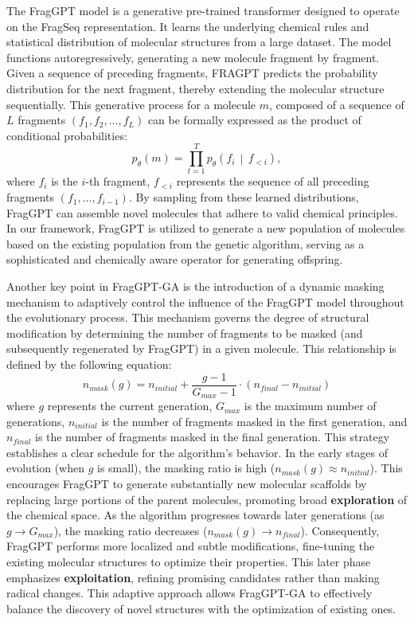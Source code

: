 \documentclass[lettersize,journal]{IEEEtran}
\begin{document}
The FragGPT model is a generative pre-trained transformer designed to operate on the FragSeq representation. It learns the underlying chemical rules and statistical distribution of molecular structures from a large dataset. The model functions autoregressively, generating a new molecule fragment by fragment. Given a sequence of preceding fragments, FRAGPT predicts the probability distribution for the next fragment, thereby extending the molecular structure sequentially. This generative process for a molecule $m$, composed of a sequence of $L$ fragments $(f_1, f_2, ..., f_L)$ can be formally expressed as the product of conditional probabilities:
\begin{equation}
p_{\theta}(m)=\prod_{t=1}^{T} p_{\theta}\!\left(f_i \,\middle|\, f_{<i}\right),
\end{equation}
where $f_i$ is the $i$-th fragment, $f_{<i}$ represents the sequence of all preceding fragments $(f_1,...,f_{i-1})$. By sampling from these learned distributions, FragGPT can assemble novel molecules that adhere to valid chemical principles. In our framework, FragGPT is utilized to generate a new population of molecules based on the existing population from the genetic algorithm, serving as a sophisticated and chemically aware operator for generating offspring.

Another key point in FragGPT-GA is the introduction of a dynamic masking mechanism to adaptively control the influence of the FragGPT model throughout the evolutionary process. This mechanism governs the degree of structural modification by determining the number of fragments to be masked (and subsequently regenerated by FragGPT) in a given molecule. This relationship is defined by the following equation:
\begin{equation}
n_{mask}(g) = n_{initial} + \frac{g-1}{G_{max}-1} \cdot (n_{final} - n_{initial})
\end{equation}
where $g$ represents the current generation, $G_{max}$ is the maximum number of generations, $n_{initial}$ is the number of fragments masked in the first generation, and $n_{final}$ is the number of fragments masked in the final generation. This strategy establishes a clear schedule for the algorithm's behavior. In the early stages of evolution (when $g$ is small), the masking ratio is high ($n_{mask}(g) \approx n_{initial}$). This encourages FragGPT to generate substantially new molecular scaffolds by replacing large portions of the parent molecules, promoting broad \textbf{exploration} of the chemical space. As the algorithm progresses towards later generations (as $g \to G_{max}$), the masking ratio decreases ($n_{mask}(g) \to n_{final}$). Consequently, FragGPT performs more localized and subtle modifications, fine-tuning the existing molecular structures to optimize their properties. This later phase emphasizes \textbf{exploitation}, refining promising candidates rather than making radical changes. This adaptive approach allows FragGPT-GA to effectively balance the discovery of novel structures with the optimization of existing ones.
\end{document}
